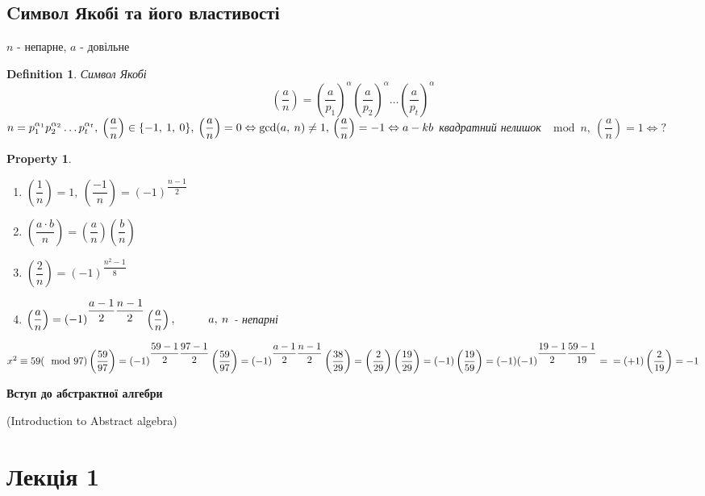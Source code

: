\documentclass[a4paper,12pt, centered]{bookest}
\newtheorem{definition}{Definition}[section]
\newtheorem*{property*}{Property}
\newcommand\tab[1][1cm]{\hspace*{#1}}
\begin{document}
\section{Cимвол Якобі та його властивості}
$n$ - непарне, $a$ - довільне
\begin{definition}Символ Якобі
	$$\left(\dfrac an\right)=\left(\dfrac a{p_1}\right)^\alpha\left(\dfrac a{p_2}\right)^\alpha\dots\left(\dfrac a{p_t}\right)^\alpha$$
	$n=p_1^{\alpha_1}p_2^{\alpha_2}\dots p_t^{\alpha_t},\>\left(\dfrac an\right)\in\{-1,\>1,\>0\},\>\left(\dfrac an\right)=0\Leftrightarrow\gcd(a,\>n)\ne 1,\\\left(\dfrac an\right)=-1\Leftrightarrow a-kb$ квадратний нелишок $\mod n,\>\left(\dfrac an\right)=1\Leftrightarrow?$
\end{definition}
\begin{property*}$ $
	\begin{enumerate}
		\item $\left(\dfrac 1n\right)=1,\>\left(\dfrac {-1}n\right)=(-1)^{\dfrac{n-1}{2}}$
		\item $\left(\dfrac {a\cdot b}n\right)=\left(\dfrac an\right)\left(\dfrac bn\right)$
		\item $\left(\dfrac 2n\right)=(-1)^{\dfrac{n^2-1}{8}}$
		\item $\left(\dfrac an\right)=(-1)^{\dfrac{a-1}{2}\dfrac{n-1}{2}}\left(\dfrac an\right),\tab a,\>n$ - непарні
	\end{enumerate}
\end{property*}
\begin{example}
	$x^2\equiv 59(\mod 97)\\\left(\dfrac {59}{97}\right)=(-1)^{\dfrac{59-1}{2}\dfrac{97-1}{2}}\left(\dfrac {59}{97}\right)=(-1)^{\dfrac{a-1}{2}\dfrac{n-1}{2}}\left(\dfrac {38}{29}\right)=\left(\dfrac {2}{29}\right)\left(\dfrac {19}{29}\right)=(-1) \left(\dfrac {19}{59}\right)=(-1)(-1)^{\dfrac{19-1}{2}\dfrac{59-1}{19}}=\\=(+1)\left(\dfrac {2}{19}\right)=-1$
\end{example}
\newpage
\thispagestyle{empty}
 \hspace{0pt}
\vfill
\begin{center}
	\LARGE{\textbf{Вступ до абстрактної алгебри}}
\end{center}
\begin{center}
	(Introduction to Abstract algebra)
\end{center}
\vfill
\hspace{0pt}
\pagebreak
\newpage
\chapter{Лекція 1}
\end{document}
